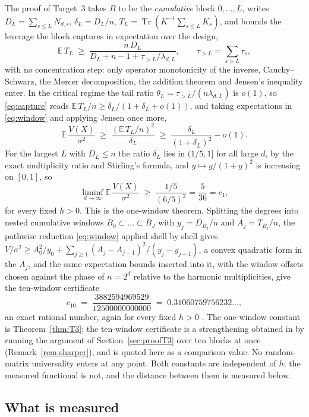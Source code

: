 \documentclass[11pt]{article}
\theoremstyle{definition}
\DeclareMathOperator{\Tr}{Tr}
\newcommand{\E}{\mathbb{E}}
\newcommand{\numCtenLong}{0.31060759756232}
\begin{document}
The proof of Target~3 \cite{PN24} takes $B$ to be the \emph{cumulative} block $0,\dots,L$, writes
$D_L=\sum_{s\le L}N_{d,s}$, $\delta_L=D_L/n$, $T_L=\Tr(K^{-1}\sum_{s\le L}K_s)$, and bounds the
leverage the block captures in expectation over the design,
\begin{equation}
\E\,T_L\;\ge\;\frac{n\,D_L}{D_L+n-1+\tau_{>L}/\lambda_{d,L}},
\qquad \tau_{>L}=\sum_{s>L}\tau_s ,
\label{eq:capture}
\end{equation}
with no concentration step: only operator monotonicity of the inverse, Cauchy--Schwarz, the Mercer
decomposition, the addition theorem and Jensen's inequality enter. In the critical regime the tail ratio $\theta_L=\tau_{>L}/(n\lambda_{d,L})$ is $o(1)$,
so \eqref{eq:capture} reads $\E\,T_L/n\ge\delta_L/(1+\delta_L+o(1))$, and taking expectations in
\eqref{eq:window} and applying Jensen once more,
\begin{equation}
\E\,\frac{V(X)}{\sigma^2}\;\ge\;\frac{(\E\,T_L/n)^2}{\delta_L}\;\ge\;
\frac{\delta_L}{(1+\delta_L)^2}-o(1).
\label{eq:onewindow}
\end{equation}
For the largest $L$ with $D_L\le n$ the ratio $\delta_L$ lies in $(1/5,1]$ for all large $d$, by the
exact multiplicity ratio and Stirling's formula, and $y\mapsto y/(1+y)^2$ is increasing on $[0,1]$,
so
\[
\liminf_{d\to\infty}\E\,\frac{V(X)}{\sigma^2}\;\ge\;\frac{1/5}{(6/5)^2}=\frac{5}{36}=c_1 ,
\]
for every fixed $h>0$. This is the one-window theorem. Splitting the degrees into nested cumulative
windows $B_0\subset\dots\subset B_J$ with $y_j=D_{B_j}/n$ and $A_j=T_{B_j}/n$, the pathwise
reduction \eqref{eq:window} applied shell by shell gives
$V/\sigma^2\ge A_0^2/y_0+\sum_{j\ge1}(A_j-A_{j-1})^2/(y_j-y_{j-1})$, a convex quadratic form in the
$A_j$, and the same expectation bounds inserted into it, with the window offsets chosen against the
phase of $n=2^d$ relative to the harmonic multiplicities, give the ten-window certificate
\[
c_{10}\;=\;\frac{3882594969529}{12500000000000}\;=\;\numCtenLong\ldots ,
\]
an exact rational number, again for every fixed $h>0$ \cite{PN24}. The one-window constant is Theorem~\ref{thm:T3}; the ten-window certificate is a strengthening
obtained in \cite{PN24} by running the argument of Section~\ref{sec:proofT3} over ten blocks at once
(Remark~\ref{rem:sharper}), and is quoted here as a comparison value. No random-matrix universality
enters at any point. Both constants are independent of $h$; the measured functional is not, and the distance
between them is measured below.

\subsection{What is measured}
\end{document}
